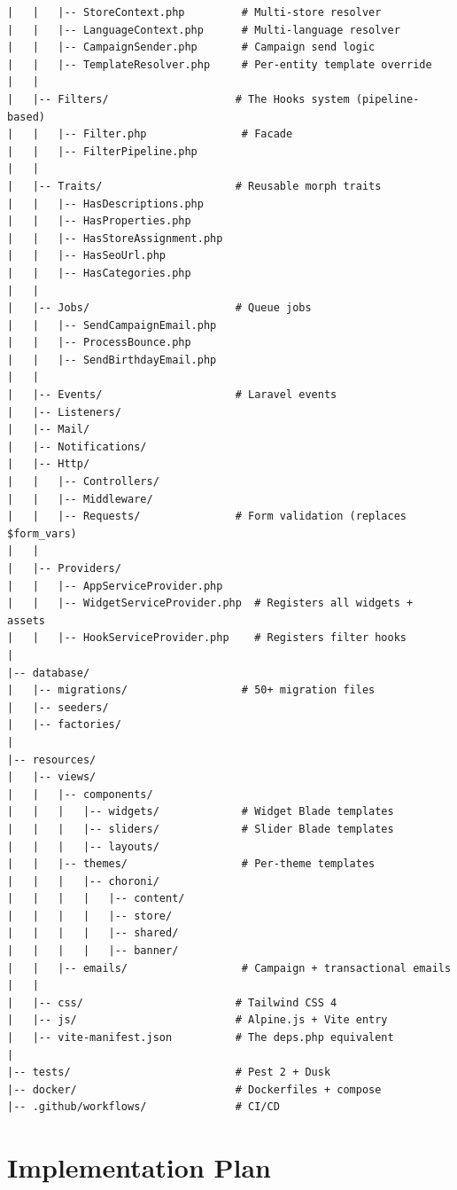 \documentclass[11pt,a4paper]{article}
\begin{document}
\begin{lstlisting}[caption={New Necoyoad directory structure (abridged).},label={lst:dir}]
|   |   |-- StoreContext.php         # Multi-store resolver
|   |   |-- LanguageContext.php      # Multi-language resolver
|   |   |-- CampaignSender.php       # Campaign send logic
|   |   |-- TemplateResolver.php     # Per-entity template override
|   |
|   |-- Filters/                    # The Hooks system (pipeline-based)
|   |   |-- Filter.php               # Facade
|   |   |-- FilterPipeline.php
|   |
|   |-- Traits/                     # Reusable morph traits
|   |   |-- HasDescriptions.php
|   |   |-- HasProperties.php
|   |   |-- HasStoreAssignment.php
|   |   |-- HasSeoUrl.php
|   |   |-- HasCategories.php
|   |
|   |-- Jobs/                       # Queue jobs
|   |   |-- SendCampaignEmail.php
|   |   |-- ProcessBounce.php
|   |   |-- SendBirthdayEmail.php
|   |
|   |-- Events/                     # Laravel events
|   |-- Listeners/
|   |-- Mail/
|   |-- Notifications/
|   |-- Http/
|   |   |-- Controllers/
|   |   |-- Middleware/
|   |   |-- Requests/               # Form validation (replaces $form_vars)
|   |
|   |-- Providers/
|   |   |-- AppServiceProvider.php
|   |   |-- WidgetServiceProvider.php  # Registers all widgets + assets
|   |   |-- HookServiceProvider.php    # Registers filter hooks
|
|-- database/
|   |-- migrations/                  # 50+ migration files
|   |-- seeders/
|   |-- factories/
|
|-- resources/
|   |-- views/
|   |   |-- components/
|   |   |   |-- widgets/             # Widget Blade templates
|   |   |   |-- sliders/             # Slider Blade templates
|   |   |   |-- layouts/
|   |   |-- themes/                  # Per-theme templates
|   |   |   |-- choroni/
|   |   |   |   |-- content/
|   |   |   |   |-- store/
|   |   |   |   |-- shared/
|   |   |   |   |-- banner/
|   |   |-- emails/                  # Campaign + transactional emails
|   |
|   |-- css/                        # Tailwind CSS 4
|   |-- js/                         # Alpine.js + Vite entry
|   |-- vite-manifest.json          # The deps.php equivalent
|
|-- tests/                          # Pest 2 + Dusk
|-- docker/                         # Dockerfiles + compose
|-- .github/workflows/              # CI/CD
\end{lstlisting}

\section{Implementation Plan}\label{sec:plan}
\end{document}
